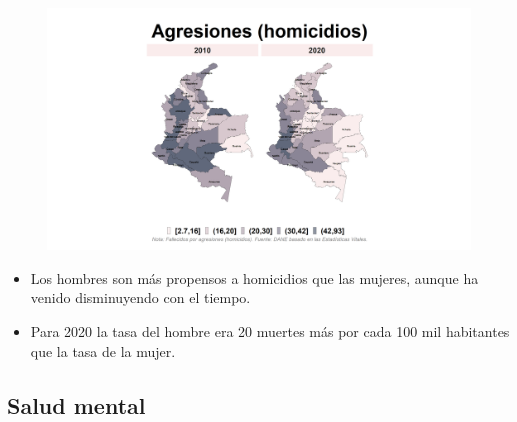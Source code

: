     \begin{figure}[H]
        \caption[Agresiones (homicidios) por género ]{\label{homicid_gen_map} }
        \begin{center}
        \includegraphics[width=\textwidth,keepaspectratio]{img/var_286_map.png}
        \end{center}
    \end{figure}
            \begin{itemize}
                \item Los hombres son más propensos a homicidios que las mujeres, aunque ha venido disminuyendo con el tiempo.
                \item Para 2020 la tasa del hombre era 20 muertes más por cada 100 mil habitantes que la tasa de la mujer.
                \end{itemize}

    \subsection{Salud mental}

